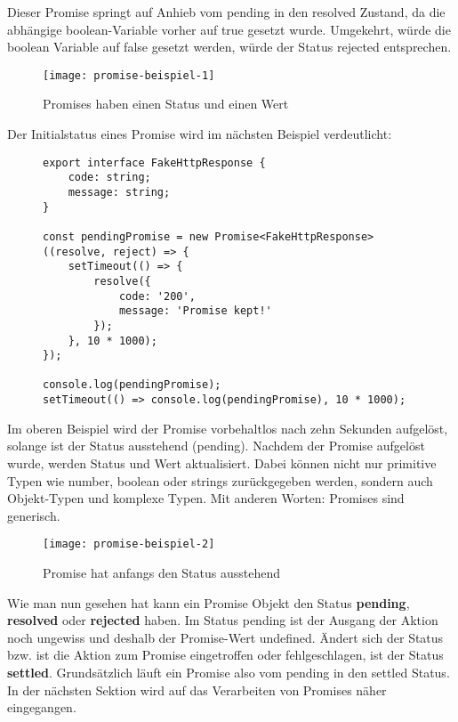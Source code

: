 \noindent
Dieser Promise springt auf Anhieb vom pending in den resolved Zustand, da die abhängige boolean-Variable vorher auf true gesetzt wurde. Umgekehrt, würde die boolean Variable auf false gesetzt werden, würde der Status rejected entsprechen.

\begin{figure}[H]
\centering
\texttt{[image: promise-beispiel-1]}
\caption{Promises haben einen Status und einen Wert}
\end{figure}

\noindent
Der Initialstatus eines Promise wird im nächsten Beispiel verdeutlicht:

\begin{figure}[H]
\begin{lstlisting}[basicstyle=\small]
export interface FakeHttpResponse {
    code: string;
    message: string;
}

const pendingPromise = new Promise<FakeHttpResponse>((resolve, reject) => {
    setTimeout(() => {
        resolve({
            code: '200',
            message: 'Promise kept!'
        });
    }, 10 * 1000);
});

console.log(pendingPromise);
setTimeout(() => console.log(pendingPromise), 10 * 1000);
\end{lstlisting}
\end{figure}

\noindent
Im oberen Beispiel wird der Promise vorbehaltlos nach zehn Sekunden aufgelöst, solange ist der Status ausstehend (pending). Nachdem der Promise aufgelöst wurde, werden Status und Wert aktualisiert. Dabei können nicht nur primitive Typen wie number, boolean oder strings zurückgegeben werden, sondern auch Objekt-Typen und komplexe Typen. Mit anderen Worten: Promises sind generisch.

\begin{figure}[H]
\centering
\texttt{[image: promise-beispiel-2]}
\caption{Promise hat anfangs den Status \glqq{}ausstehend\grqq{}}
\end{figure}

\noindent
Wie man nun gesehen hat kann ein Promise Objekt den Status  \textbf{pending}, \textbf{resolved} oder \textbf{rejected} haben. Im Status pending ist der Ausgang der Aktion noch ungewiss und deshalb der Promise-Wert undefined. Ändert sich der Status bzw. ist die Aktion zum Promise eingetroffen oder fehlgeschlagen, ist der Status \textbf{settled}. Grundsätzlich läuft ein Promise also vom pending in den settled Status. In der nächsten Sektion wird auf das Verarbeiten von Promises näher eingegangen.

